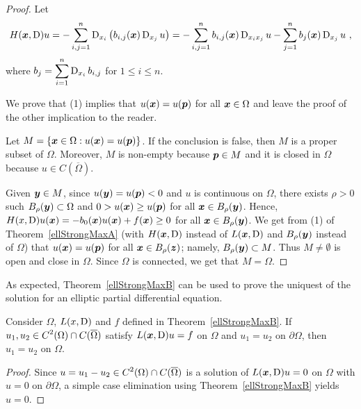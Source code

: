 \begin{proof}
Let
\begin{equation} \label{strongMaxEq3}
H({\bm{x}},\operatorname{D})u = - \sum_{i,j=1}^n
\operatorname{D}_{x_i} \left( b_{i,j}({\bm{x}}) \operatorname{D}_{x_j} u \right)
= - \sum_{i,j=1}^n b_{i,j}({\bm{x}}) \operatorname{D}_{x_i x_j} u
- \sum_{j=1}^n b_j({\bm{x}}) \operatorname{D}_{x_j} u \ ,
\end{equation}
where $\displaystyle b_j = \sum_{i=1}^n \operatorname{D}_{x_i} b_{i,j}$ for
$1 \leq i \leq n$.

We prove that (1) implies that $u({\bm{x}})= u({\bm{p}})$ for all
${\bm{x}} \in \Omega$ and leave the proof of the other implication to
the reader.

Let $M = \left\{ {\bm{x}} \in \Omega : u({\bm{x}}) = u({\bm{p}}) \right\}$.
If the conclusion is false, then $M$ is a proper subset of $\Omega$.
Moreover, $M$ is non-empty because ${\bm{p}} \in M$ and it is
closed in $\Omega$ because $u \in C(\overline{\Omega})$.

Given ${\bm{y}} \in M$, since $u({\bm{y}}) = u({\bm{p}}) <0$ and $u$ is
continuous on $\Omega$, there exists
$\rho>0$ such $B_{\rho}({\bm{y}}) \subset \Omega$ and
$0 > u({\bm{x}}) \geq u({\bm{p}})$ for all ${\bm{x}} \in B_{\rho}({\bm{y}})$.
Hence,
$H(x,\operatorname{D}) u({\bm{x}}) = -b_0({\bm{x}}) u({\bm{x}}) + f({\bm{x}}) \geq 0$ 
for all ${\bm{x}} \in B_{\rho}({\bm{y}})$.  We get from (1) of
Theorem~\ref{ellStrongMaxA} (with $H({\bm{x}},\operatorname{D})$ instead of
$L({\bm{x}},\operatorname{D})$ and $B_{\rho}({\bm{y}})$ instead of $\Omega$) that
$u({\bm{x}}) = u({\bm{p}})$ for all ${\bm{x}} \in B_{\rho}({\bm{z}})$;
namely, $B_{\rho}({\bm{y}}) \subset M$.  Thus $M \neq \emptyset$ is
open and close in $\Omega$.  Since $\Omega$ is connected, we get that
$M = \Omega$.
\end{proof}

As expected, Theorem~\ref{ellStrongMaxB} can be used to prove the
uniquest of the solution for an elliptic partial differential equation.

\begin{cor}
Consider $\Omega$, $L(x,\operatorname{D})$ and $f$ defined in
Theorem~\ref{ellStrongMaxB}.  If
$\displaystyle u_1 , u_2 \in C^2(\Omega) \cap C(\overline{\Omega})$
satisfy $L({\bm{x}},\operatorname{D}) u = f$ on $\Omega$ and $u_1 = u_2$ on
$\partial \Omega$, then $u_1 = u_2$ on $\Omega$.
\end{cor}

\begin{proof}
Since $\displaystyle u = u_1-u_2 \in C^2(\Omega) \cap C(\overline{\Omega})$
is a solution of $L({\bm{x}},\operatorname{D}) u = 0$ on $\Omega$ with $u=0$ on
$\partial \Omega$, a simple case elimination using
Theorem~\ref{ellStrongMaxB} yields $u = 0$.
\end{proof}

